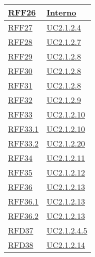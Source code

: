 \begin{longtable}{|>{\centering}m{5cm}|m{5cm}<{\centering}|}
	\hyperlink{RFF26}{RFF26} & \hyperref[Interno]{Interno}\\ \hline
	
	\hyperlink{RFF27}{RFF27} & \hyperref[UC2.1.2.4]{UC2.1.2.4}\\ \hline
	
	\hyperlink{RFF28}{RFF28} & \hyperref[UC2.1.2.7]{UC2.1.2.7}\\ \hline
	
	\hyperlink{RFF29}{RFF29} & \hyperref[UC2.1.2.8]{UC2.1.2.8}\\ \hline
	
	\hyperlink{RFF30}{RFF30} & \hyperref[UC2.1.2.8]{UC2.1.2.8}\\ \hline
	
	\hyperlink{RFF31}{RFF31} & \hyperref[UC2.1.2.8]{UC2.1.2.8}\\ \hline
	
	\hyperlink{RFF32}{RFF32} & \hyperref[UC2.1.2.9]{UC2.1.2.9}\\ \hline
	
	\hyperlink{RFF33}{RFF33} & \hyperref[UC2.1.2.10]{UC2.1.2.10}\\ \hline
	
	\hyperlink{RFF33.1}{RFF33.1} & \hyperref[UC2.1.2.10]{UC2.1.2.10}\\ \hline
	
	\hyperlink{RFF33.2}{RFF33.2} & \hyperref[UC2.1.2.20]{UC2.1.2.20}\\ \hline
	
	\hyperlink{RFF34}{RFF34} & \hyperref[UC2.1.2.11]{UC2.1.2.11}\\ \hline
	
	\hyperlink{RFF35}{RFF35} & \hyperref[UC2.1.2.12]{UC2.1.2.12}\\ \hline
	
	\hyperlink{RFF36}{RFF36} & \hyperref[UC2.1.2.13]{UC2.1.2.13}\\ \hline
	
	\hyperlink{RFF36.1}{RFF36.1} & \hyperref[UC2.1.2.13]{UC2.1.2.13}\\ \hline
	
	\hyperlink{RFF36.2}{RFF36.2} & \hyperref[UC2.1.2.13]{UC2.1.2.13}\\ \hline
	
	\hyperlink{RFD37}{RFD37} & \hyperref[UC2.1.2.4.5]{UC2.1.2.4.5}\\ \hline
	
	\hyperlink{RFD38}{RFD38} & \hyperref[UC2.1.2.14]{UC2.1.2.14}\\ \hline
	

\end{longtable}
